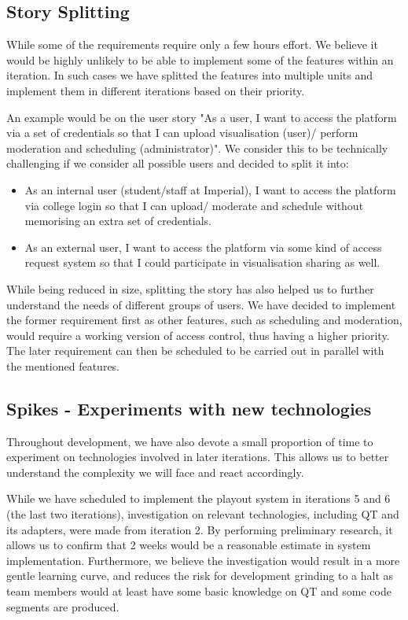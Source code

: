 \documentclass[a4paper]{article}
\begin{document}
\subsection{Story Splitting}
While some of the requirements require only a few hours effort. We believe
it would be highly unlikely to be able to implement some of the features within an
iteration. In such cases we have splitted the features into multiple units and
implement them in different iterations based on their priority.

An example would be on the user story
 "As a user, I want to access the platform via a set of
credentials so that I can upload visualisation (user)/ perform moderation and
scheduling (administrator)". We consider this to be technically challenging
if we consider all possible users and decided to split it into:

\begin{itemize}
  \item As an internal user (student/staff at Imperial), I want to access the 
        platform via college login so that I can upload/ moderate and schedule
        without memorising an extra set of credentials.
  \item As an external user, I want to access the platform via some kind
        of access request system so that I could participate in visualisation
        sharing as well. 
\end{itemize}

While being reduced in size, splitting the story has also helped us to 
further understand the needs
of different groups of users. We have decided to implement the former requirement
first as other features, such as scheduling and moderation, would require
a working version of access control, thus having a higher priority.
The later requirement can then be scheduled
to be carried out in parallel with the mentioned features.

\subsection{Spikes - Experiments with new technologies}
Throughout development, we have also devote a small proportion of time to
experiment on technologies involved in later iterations. This allows us to
better understand the complexity we will face and react accordingly.

While we have scheduled to implement the playout system in iterations 5 and 6
(the last two iterations),
investigation on relevant technologies, including QT and its adapters, were
made from iteration 2. By performing preliminary research, it allows 
us to confirm that 2 weeks would be a reasonable estimate in system 
implementation. Furthermore, we believe the investigation would result 
in a more gentle learning curve, and reduces the risk for development 
grinding to a halt as team members would
at least have some basic knowledge on QT and some code segments are produced.
\end{document}
